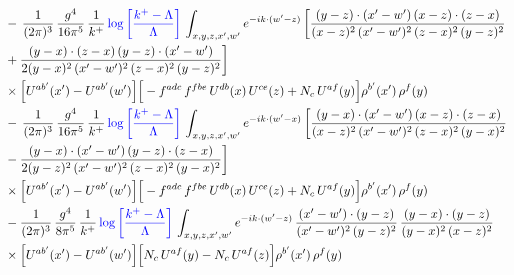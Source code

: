 \documentclass[10pt]{article}
\begin{document}
\begin{align}
& -\, \frac{1}{(2\pi)^{3}}\,\frac{g^{4}}{16\pi^{5}}\,\frac{1}{k^{+}}\,{\color{blue}\log{\left[\frac{k^{+}-\Lambda}{\Lambda}\right]}}\,\int_{x,y,z,x',w'}e^{-ik\cdot(w'-z)}\,\bigg[\frac{(y-z)\cdot (x'-w')\,(x-z)\cdot (z-x)}{(x-z)^{2}\,(x'-w')^{2}\,(z-x)^{2}\,(y-z)^{2}}\notag \\ & +\frac{(y-x)\cdot (z-x)\,(y-z)\cdot (x'-w')}{2(y-x)^{2}\,(x'-w')^{2}\,(z-x)^{2}\,(y-z)^{2}}\bigg]\notag\\ &\times \Big[U^{ab'}(x')-U^{ab'}(w')\Big]\Big[-f^{adc}\,f^{fbe}\,U^{db}(x)\,U^{ce}(z)+N_{c}\,U^{af}(y)\Big]\rho^{b'}(x')\,\rho^{f}(y)\notag \\
& -\, \frac{1}{(2\pi)^{3}}\,\frac{g^{4}}{16\pi^{5}}\,\frac{1}{k^{+}}\,{\color{blue}\log{\left[\frac{k^{+}-\Lambda}{\Lambda}\right]}}\,\int_{x,y,z,x',w'}e^{-ik\cdot(w'-x)}\, \bigg[\frac{(y-x)\cdot (x'-w')\,(x-z)\cdot (z-x)}{(x-z)^{2}\,(x'-w')^{2}\,(z-x)^{2}\,(y-x)^{2}}\notag \\ & -\frac{(y-x)\cdot (x'-w')\,(y-z)\cdot (z-x)}{2(y-z)^{2}\,(x'-w')^{2}\,(z-x)^{2}\,(y-x)^{2}}\bigg]\notag\\ &\times \Big[U^{ab'}(x')-U^{ab'}(w')\Big]\Big[-f^{adc}\,f^{fbe}\,U^{db}(x)\,U^{ce}(z)+N_{c}\,U^{af}(y)\Big]\rho^{b'}(x')\,\rho^{f}(y)\notag \\
& - \frac{1}{(2\pi)^{3}}\,\frac{g^{4}}{8\pi^{5}}\,\frac{1}{k^{+}}\,{\color{blue}\log{\left[\frac{k^{+}-\Lambda}{\Lambda}\right]}}\,\int_{x,y,z,x',w'}e^{-ik\cdot(w'-z)}\,\frac{(x'-w')\cdot(y-z)}{(x'-w')^{2}\,(y-z)^{2}}\,\frac{(y-x)\cdot(y-z)}{(y-x)^{2}\,(x-z)^{2}}\notag \\ & \times\Big[U^{ab'}(x')-U^{ab'}(w')\Big]\Big[N_{c}\,U^{af}(y)-N_{c}\,U^{af}(z)\Big]\rho^{b'}(x')\,\rho^{f}(y)
\end{align}
\end{document}
